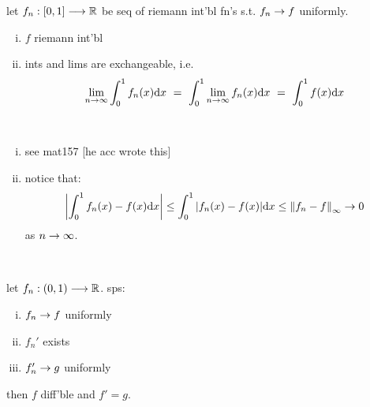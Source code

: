 \begin{lm}
    let $f_{n}:[0,1]\longrightarrow\mathbb{R}$ be seq of riemann int'bl fn's s.t. $f_{n}\rightarrow f$ uniformly.
	\begin{enumerate}[(i)]
		\item $f$ riemann int'bl
		\item ints and lims are exchangeable, i.e.
			\begin{equation*}
			    \lim_{n\rightarrow\infty}\int_{0}^{1}f_{n}(x)\textrm{d} x
				\ = \ \int_{0}^{1}\lim_{n\rightarrow\infty}f_{n}(x)\textrm{d} x
				\ = \ \int_{0}^{1}f(x)\textrm{d} x
			\end{equation*}
	\end{enumerate}
\end{lm} \

\newpage
\begin{pf}[source=Primary Source Material]
    \vspace{-0.2in}
	\begin{enumerate}[(i)]
		\item see mat157 [he acc wrote this]
		\item notice that:
			\begin{equation*}
			    \abs{\int_{0}^{1}f_{n}(x)-f(x)\textrm{d} x} \leq
				\int_{0}^{1}\abs{f_{n}(x)-f(x)}\textrm{d} x \leq
				\left\|f_{n}-f\right\|_{\infty} \rightarrow 0
			\end{equation*}
			as $n\rightarrow\infty$.
	\end{enumerate}
\end{pf} \

\begin{lm}
    let $f_{n}:(0,1)\longrightarrow\mathbb{R}$. sps:
	\begin{enumerate}[(i)]
		\item $f_{n}\rightarrow f$ uniformly
		\item $f_{n}'$ exists
		\item $f_{n}'\rightarrow g$ uniformly
	\end{enumerate}
	then $f$ diff'ble and $f'=g$.
\end{lm} \

